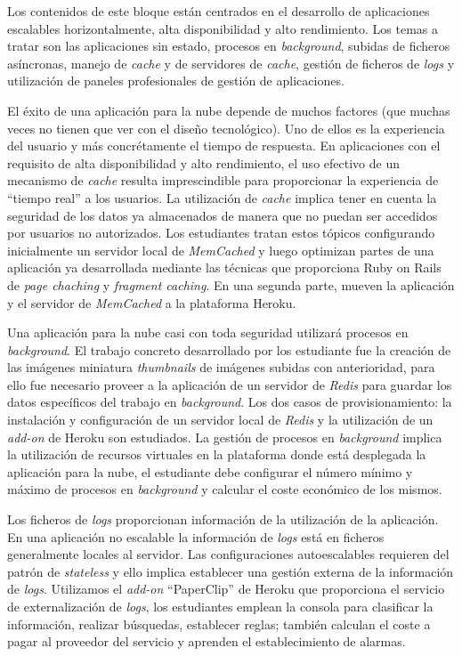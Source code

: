 \documentclass[conference]{IEEEtran}
\begin{document}
Los contenidos de este bloque están centrados en el desarrollo de aplicaciones escalables horizontalmente, alta disponibilidad y alto rendimiento.
Los temas a tratar son las aplicaciones sin estado, procesos en \textit{background}, subidas de ficheros asíncronas,
manejo de \textit{cache} y  de servidores de \textit{cache},
gestión de ficheros de \textit{logs} y utilización de paneles profesionales de gestión de aplicaciones.

El éxito de una aplicación para la nube depende de muchos factores (que muchas veces no tienen que ver con el diseño tecnológico).
Uno de ellos es la experiencia del usuario y más concrétamente el tiempo de respuesta.
En aplicaciones con el requisito de alta disponibilidad y alto rendimiento, el uso efectivo de un mecanismo de \textit{cache} resulta imprescindible para proporcionar la experiencia de ``tiempo real'' a los usuarios.
La utilización de \textit{cache} implica tener en cuenta la seguridad de los datos ya almacenados de manera que no puedan ser accedidos por usuarios no autorizados.
Los estudiantes tratan estos tópicos configurando inicialmente un servidor local de \textit{MemCached} y luego optimizan partes de una aplicación ya desarrollada mediante las técnicas que proporciona Ruby on Rails de
\textit{page chaching} y \textit{fragment caching}. En una segunda parte, mueven la aplicación y el servidor de \textit{MemCached} a la plataforma Heroku.


Una aplicación para la nube casi con toda seguridad utilizará procesos en \textit{background}. El trabajo concreto desarrollado por los estudiante fue la creación de las imágenes  miniatura
\textit{thumbnails} de imágenes subidas con anterioridad, para ello fue necesario proveer a la aplicación de un servidor de \textit{Redis} para guardar los datos específicos del trabajo en 
\textit{background}. Los dos casos de provisionamiento: la instalación y configuración de un servidor local de \textit{Redis} y la utilización de un \textit{add-on} de Heroku son estudiados.
La gestión de  procesos en \textit{background} implica la utilización de recursos virtuales en la plataforma donde está desplegada la aplicación para la nube,
el estudiante debe configurar el número mínimo y máximo de procesos en \textit{background} y calcular el coste económico de los mismos.
 
Los ficheros de \textit{logs} proporcionan información de la utilización de la aplicación. En una aplicación no escalable la información de \textit{logs} está en ficheros generalmente locales al servidor.
Las configuraciones autoescalables requieren del patrón de \textit{stateless} y ello implica establecer una gestión externa de la información de \textit{logs}.
Utilizamos el \textit{add-on} ``PaperClip'' de Heroku que proporciona el servicio de externalización de \textit{logs}, los estudiantes emplean la consola para clasificar la información,
realizar búsquedas, establecer reglas; también calculan el coste a pagar al proveedor del servicio y aprenden el establecimiento de alarmas.
\end{document}
